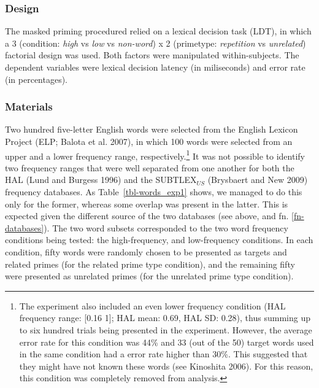 \documentclass[
]{interact}
\begin{document}
\subsubsection{Design}\label{sec-exp1-methods-design}

The masked priming procedured relied on a lexical decision task (LDT),
in which a 3 (condition: \emph{high} vs \emph{low} vs \emph{non-word}) x
2 (primetype: \emph{repetition} vs \emph{unrelated}) factorial design
was used. Both factors were manipulated within-subjects. The dependent
variables were lexical decision latency (in miliseconds) and error rate
(in percentages).

\subsubsection{Materials}\label{sec-exp1-methods-materials}

Two hundred five-letter English words were selected from the English
Lexicon Project (ELP; Balota et al. 2007), in which 100 words were
selected from an upper and a lower frequency range,
respectively.\footnote{The experiment also included an even lower
  frequency condition (HAL frequency range: {[}0.16 1{]}; HAL mean:
  0.69, HAL SD: 0.28), thus summing up to six hundred trials being
  presented in the experiment. However, the average error rate for this
  condition was 44\% and 33 (out of the 50) target words used in the
  same condition had a error rate higher than 30\%. This suggested that
  they might have not known these words (see Kinoshita 2006). For this
  reason, this condition was completely removed from analysis.} It was
not possible to identify two frequency ranges that were well separated
from one another for both the HAL (Lund and Burgess 1996) and the
SUBTLEX\(_{US}\) (Brysbaert and New 2009) frequency databases. As
Table~\ref{tbl-words_exp1} shows, we managed to do this only for the
former, whereas some overlap was present in the latter. This is expected
given the different source of the two databases (see above, and fn.
\ref{fn-databases}). The two word subsets corresponded to the two word
frequency conditions being tested: the high-frequency, and low-frequency
conditions. In each condition, fifty words were randomly chosen to be
presented as targets and related primes (for the related prime type
condition), and the remaining fifty were presented as unrelated primes
(for the unrelated prime type condition).
\end{document}
